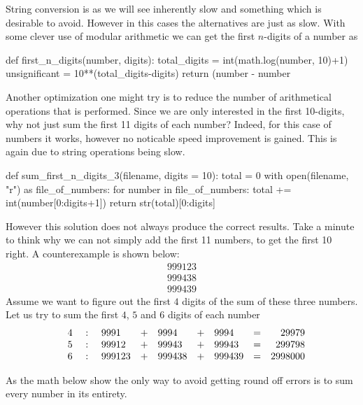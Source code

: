 String conversion is as we will see inherently slow and something which is desirable to avoid. However in this cases the alternatives are just as slow. With some clever
use of modular arithmetic we can get the first $n$-digits of a number as
%
\begin{pythoncode}
	def first_n_digits(number, digits):
    	total_digits = int(math.log(number, 10)+1)
    	unsignificant = 10**(total_digits-digits)
   		return (number - number%
\end{pythoncode}
%
Another optimization one might try is to reduce the number of arithmetical operations that is performed. Since we are only interested in the first 10-digits, why not
just sum the first 11 digits of each number? Indeed, for this case of numbers it works, however no noticable speed improvement is gained. This is again due to string 
operations being slow. 
%
\begin{pythoncode}
	def sum_first_n_digits_3(filename, digits = 10):
		total = 0
		with open(filename, "r") as file_of_numbers:
			for number in file_of_numbers:
				total += int(number[0:digits+1])
    	return str(total)[0:digits]
\end{pythoncode}
%
However this solution does not always produce the correct results. Take a minute to think why we can not simply add the first 11 numbers, to get the first 10 right. A counterexample is shown below:
\begin{align*}
	999123 \\
	999438 \\
	999439
\end{align*}
Assume we want to figure out the first $4$ digits of the sum of these three numbers. Let us try to sum the first $4$, $5$ and $6$ digits of each number
\begin{align*}
	\begin{array}{c c c lc lc lc r}
		& 4 & \ : \ & 9991   & + & 9994   & + & 9994   & = &   29979 \\
		& 5 & \ : \ & 99912  & + & 99943  & + & 99943  & = &  299798 \\
		& 6 & \ : \ & 999123 & + & 999438 & + & 999439 & = & 2998000
	\end{array}
\end{align*}

As the math below show the only way to avoid getting round off errors is to sum every number in its entirety. 
